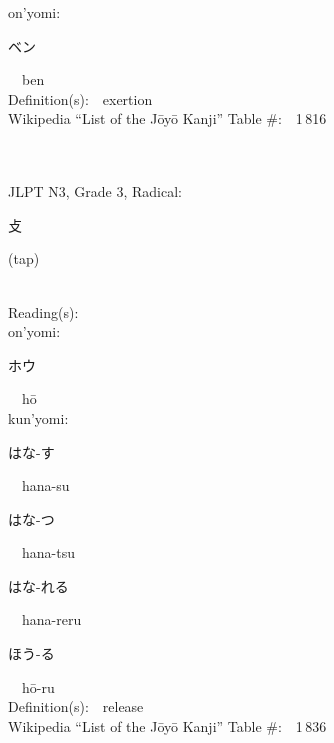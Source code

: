 \begin{multicols}{2}
{\hspace*{1em}}on'yomi:\ \ \\
{\hspace*{2em}}{\begin{CJK}{UTF8}{min} ベン \end{CJK}}\ \ ben\ \ \\
Definition(s):\ \ exertion \\
Wikipedia ``List of the J\=oy\=o Kanji'' Table \#:\ \ 1\,816 \\
\ \ \\
{\fontsize{34pt}{40pt}  }\ \ \\  %
{JLPT N3, Grade 3, Radical:\ \ {\begin{CJK}{UTF8}{min} 攴 \end{CJK}} (tap) } \\
Reading(s):\ \ \\
{\hspace*{1em}}on'yomi:\ \ \\
{\hspace*{2em}}{\begin{CJK}{UTF8}{min} ホウ \end{CJK}}\ \ h\=o\ \ \\
{\hspace*{1em}}kun'yomi:\ \ \\
{\hspace*{2em}}{\begin{CJK}{UTF8}{min} はな-す \end{CJK}}\ \ hana-su\ \ \\
{\hspace*{2em}}{\begin{CJK}{UTF8}{min} はな-つ \end{CJK}}\ \ hana-tsu\ \ \\
{\hspace*{2em}}{\begin{CJK}{UTF8}{min} はな-れる \end{CJK}}\ \ hana-reru\ \ \\
{\hspace*{2em}}{\begin{CJK}{UTF8}{min} ほう-る \end{CJK}}\ \ h\=o-ru\ \ \\
Definition(s):\ \ release \\
Wikipedia ``List of the J\=oy\=o Kanji'' Table \#:\ \ 1\,836 \\

\end{multicols}
